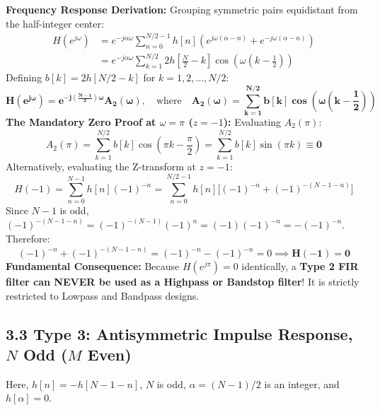 \documentclass[11pt,a4paper]{article}
\begin{document}
\noindent\textbf{Frequency Response Derivation:}
Grouping symmetric pairs equidistant from the half-integer center:
\begin{align}
H(e^{j\omega}) &= e^{-j\alpha \omega} \sum_{n=0}^{N/2-1} h[n] \left( e^{j\omega(\alpha - n)} + e^{-j\omega(\alpha - n)} \right) \nonumber \\
&= e^{-j\alpha \omega} \sum_{k=1}^{N/2} 2h\left[\frac{N}{2} - k\right] \cos\left( \omega\left(k - \frac{1}{2}\right) \right)
\end{align}
Defining $b[k] = 2h[N/2 - k]$ for $k = 1, 2, \dots, N/2$:
\begin{equation}
\mathbf{H(e^{j\omega}) = e^{-j\left(\frac{N-1}{2}\right)\omega} A_2(\omega)}, \quad \text{where} \quad \mathbf{A_2(\omega) = \sum_{k=1}^{N/2} b[k] \cos\left( \omega\left(k - \frac{1}{2}\right) \right)}
\label{eq:type2_A}
\end{equation}
\textbf{The Mandatory Zero Proof at $\omega = \pi$ ($z = -1$):}
Evaluating $A_2(\pi)$:
\begin{equation}
A_2(\pi) = \sum_{k=1}^{N/2} b[k] \cos\left( \pi k - \frac{\pi}{2} \right) = \sum_{k=1}^{N/2} b[k] \sin(\pi k) \equiv \mathbf{0}
\end{equation}
Alternatively, evaluating the Z-transform at $z = -1$:
\begin{equation}
H(-1) = \sum_{n=0}^{N-1} h[n] (-1)^{-n} = \sum_{n=0}^{N/2-1} h[n] \big[(-1)^{-n} + (-1)^{-(N-1-n)}\big]
\end{equation}
Since $N-1$ is odd, $(-1)^{-(N-1-n)} = (-1)^{-(N-1)} (-1)^n = (-1)(-1)^{-n} = -(-1)^{-n}$. Therefore:
\begin{equation}
(-1)^{-n} + (-1)^{-(N-1-n)} = (-1)^{-n} - (-1)^{-n} = 0 \implies \mathbf{H(-1) = 0}
\end{equation}
\textbf{Fundamental Consequence:} Because $H(e^{j\pi}) = 0$ identically, a \textbf{Type 2 FIR filter can NEVER be used as a Highpass or Bandstop filter}! It is strictly restricted to Lowpass and Bandpass designs.

\subsection{3.3 Type 3: Antisymmetric Impulse Response, $N$ Odd ($M$ Even)}
Here, $h[n] = -h[N-1-n]$, $N$ is odd, $\alpha = (N-1)/2$ is an integer, and $h[\alpha] = 0$.
\end{document}
